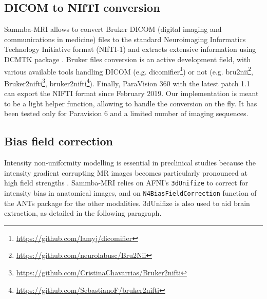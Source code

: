 \documentclass[utf8, a4paper, final, crop]{frontiersSCNS}
\newcommand{\bashinline}[1]{\texttt{#1}}
\begin{document}
\subsection{DICOM to NIfTI conversion}
Sammba-MRI allows to convert Bruker DICOM (digital imaging and communications in medicine) files to the standard  Neuroimaging Informatics Technology Initiative  format (NIfTI-1) and extracts extensive information using DCMTK package  \citep{eichelberg2004ten}. 
Bruker files conversion is an active development field,
with various available tools handling DICOM (e.g. 
dicomifier\footnote{\url{https://github.com/lamyj/dicomifier}}) or
not (e.g. bru2nii\footnote{\url{https://github.com/neurolabusc/Bru2Nii}},
Bruker2nifti\footnote{\url{https://github.com/CristinaChavarrias/Bruker2nifti}}, bruker2nifti\footnote{\url{https://github.com/SebastianoF/bruker2nifti}}).
Finally, ParaVision 360 with the latest patch 1.1 can export the NIFTI format since February 2019.
Our implementation is meant to be a light helper function, allowing to 
handle the conversion on the fly. It has been tested only for Paravision 6
and a limited number of imaging sequences.

\subsection{Bias field correction}
Intensity non-uniformity modelling is essential in preclinical studies
because the intensity gradient corrupting MR images becomes
particularly pronounced at high field strengths \citep{boyes2008intensity}.
Sammba-MRI relies on AFNI's \bashinline{3dUnifize} to correct for intensity bias in
anatomical images, and on \bashinline{N4BiasFieldCorrection} function
of the ANTs package \citep{tustison2010n4itk}
for the other modalities. 3dUnifize is also used to aid brain extraction,
as detailed in the following paragraph.
\end{document}
